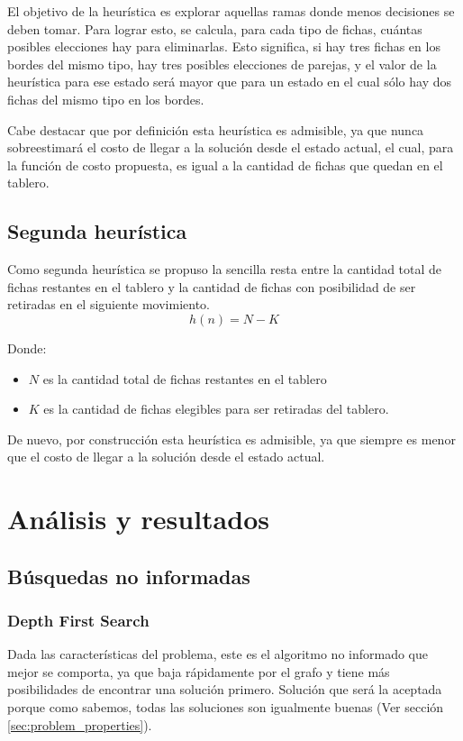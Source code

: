 \documentclass[a4paper,10pt]{article}
\begin{document}
    El objetivo de la heurística es explorar aquellas ramas donde menos decisiones se deben tomar. Para lograr esto, se calcula, para cada tipo de fichas, cuántas posibles 
    elecciones hay para eliminarlas. Esto significa, si hay tres fichas en los bordes del mismo tipo, hay tres posibles elecciones de parejas, y el valor de la heurística para 
    ese estado será mayor que para un estado en el cual sólo hay dos fichas del mismo tipo en los bordes.

    Cabe destacar que por definición esta heurística es admisible, ya que nunca sobreestimará el costo de llegar a la solución desde el estado actual, el cual, para la función de 
    costo propuesta, es igual a la cantidad de fichas que quedan en el tablero.
    
    \subsection{Segunda heurística}

    Como segunda heurística se propuso la sencilla resta entre la cantidad total de fichas restantes en el tablero y la cantidad de fichas con posibilidad de ser retiradas en el
    siguiente movimiento.\\

         \[ h(n) = N - K\] 

    Donde:
    
    \begin{itemize}
        \item $N$ es la cantidad total de fichas restantes en el tablero
        \item $K$ es la cantidad de fichas elegibles para ser retiradas del tablero.
    \end{itemize}

    De nuevo, por construcción esta heurística es admisible, ya que siempre es menor que el costo de llegar a la solución desde el estado actual.

\section{Análisis y resultados}

\subsection{Búsquedas no informadas}

    \subsubsection{Depth First Search}
    \label{sec:dfs}
    Dada las características del problema, este es el algoritmo no informado que mejor se comporta, ya que baja rápidamente por el grafo y tiene más posibilidades de 
    encontrar una solución primero.
    Solución que será la aceptada porque como sabemos, todas las soluciones son igualmente buenas (Ver sección \ref{sec:problem_properties}).\\
\end{document}
